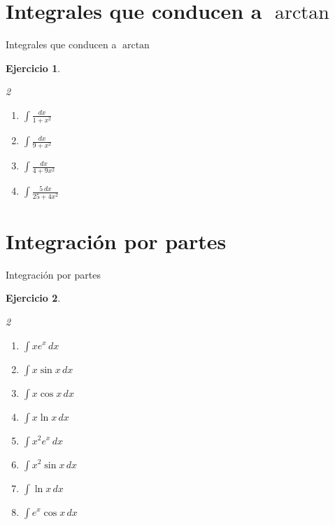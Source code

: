 \documentclass[10pt,aspectratio=169]{beamer}
\newtheorem{Ejer}{Ejercicio}
\begin{document}
\section{Integrales que conducen a $\arctan$}
\begin{frame}{Integrales que conducen a $\arctan$}
\begin{Ejer}
\begin{multicols}{2}
\begin{enumerate}
\item $\displaystyle \int \frac{dx}{1+x^2}$
\item $\displaystyle \int \frac{dx}{9+x^2}$
\item $\displaystyle \int \frac{dx}{4+9x^2}$
\item $\displaystyle \int \frac{5\,dx}{25+4x^2}$
\end{enumerate}
\end{multicols}
\end{Ejer}
\end{frame}

\section{Integración por partes}
\begin{frame}{Integración por partes}
\begin{Ejer}
\begin{multicols}{2}
\begin{enumerate}
\item $\displaystyle \int x e^x\,dx$
\item $\displaystyle \int x\sin x\,dx$
\item $\displaystyle \int x\cos x\,dx$
\item $\displaystyle \int x\ln x\,dx$
\item $\displaystyle \int x^2e^x\,dx$
\item $\displaystyle \int x^2\sin x\,dx$
\item $\displaystyle \int \ln x\,dx$
\item $\displaystyle \int e^x\cos x\,dx$
\end{enumerate}
\end{multicols}
\end{Ejer}
\end{frame}
\end{document}
